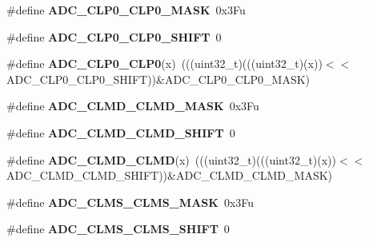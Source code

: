 \begin{DoxyCompactItemize}
\item 
\#define {\bfseries A\+D\+C\+\_\+\+C\+L\+P0\+\_\+\+C\+L\+P0\+\_\+\+M\+A\+SK}~0x3\+Fu\hypertarget{group__ADC__Register__Masks_ga7a8099e7e4fcb450308767ab0df8e458}{}\label{group__ADC__Register__Masks_ga7a8099e7e4fcb450308767ab0df8e458}

\item 
\#define {\bfseries A\+D\+C\+\_\+\+C\+L\+P0\+\_\+\+C\+L\+P0\+\_\+\+S\+H\+I\+FT}~0\hypertarget{group__ADC__Register__Masks_gad3035c445e10948c653ac0a028008109}{}\label{group__ADC__Register__Masks_gad3035c445e10948c653ac0a028008109}

\item 
\#define {\bfseries A\+D\+C\+\_\+\+C\+L\+P0\+\_\+\+C\+L\+P0}(x)~(((uint32\+\_\+t)(((uint32\+\_\+t)(x))$<$$<$A\+D\+C\+\_\+\+C\+L\+P0\+\_\+\+C\+L\+P0\+\_\+\+S\+H\+I\+FT))\&A\+D\+C\+\_\+\+C\+L\+P0\+\_\+\+C\+L\+P0\+\_\+\+M\+A\+SK)\hypertarget{group__ADC__Register__Masks_ga8ec1b8f6f0baa869f77385865e51a20d}{}\label{group__ADC__Register__Masks_ga8ec1b8f6f0baa869f77385865e51a20d}

\item 
\#define {\bfseries A\+D\+C\+\_\+\+C\+L\+M\+D\+\_\+\+C\+L\+M\+D\+\_\+\+M\+A\+SK}~0x3\+Fu\hypertarget{group__ADC__Register__Masks_ga45c4117ad9fba213c3d338cf6280cb75}{}\label{group__ADC__Register__Masks_ga45c4117ad9fba213c3d338cf6280cb75}

\item 
\#define {\bfseries A\+D\+C\+\_\+\+C\+L\+M\+D\+\_\+\+C\+L\+M\+D\+\_\+\+S\+H\+I\+FT}~0\hypertarget{group__ADC__Register__Masks_ga872bf108b50c6dd439ddc1294f104fe5}{}\label{group__ADC__Register__Masks_ga872bf108b50c6dd439ddc1294f104fe5}

\item 
\#define {\bfseries A\+D\+C\+\_\+\+C\+L\+M\+D\+\_\+\+C\+L\+MD}(x)~(((uint32\+\_\+t)(((uint32\+\_\+t)(x))$<$$<$A\+D\+C\+\_\+\+C\+L\+M\+D\+\_\+\+C\+L\+M\+D\+\_\+\+S\+H\+I\+FT))\&A\+D\+C\+\_\+\+C\+L\+M\+D\+\_\+\+C\+L\+M\+D\+\_\+\+M\+A\+SK)\hypertarget{group__ADC__Register__Masks_ga8066beb7ed493b4d9964fffd3cdefd7a}{}\label{group__ADC__Register__Masks_ga8066beb7ed493b4d9964fffd3cdefd7a}

\item 
\#define {\bfseries A\+D\+C\+\_\+\+C\+L\+M\+S\+\_\+\+C\+L\+M\+S\+\_\+\+M\+A\+SK}~0x3\+Fu\hypertarget{group__ADC__Register__Masks_ga108adc09b24001dddfd498e14213fea6}{}\label{group__ADC__Register__Masks_ga108adc09b24001dddfd498e14213fea6}

\item 
\#define {\bfseries A\+D\+C\+\_\+\+C\+L\+M\+S\+\_\+\+C\+L\+M\+S\+\_\+\+S\+H\+I\+FT}~0\hypertarget{group__ADC__Register__Masks_gabe0e92adb89c86d0523958a947288808}{}\label{group__ADC__Register__Masks_gabe0e92adb89c86d0523958a947288808}


\end{DoxyCompactItemize}
